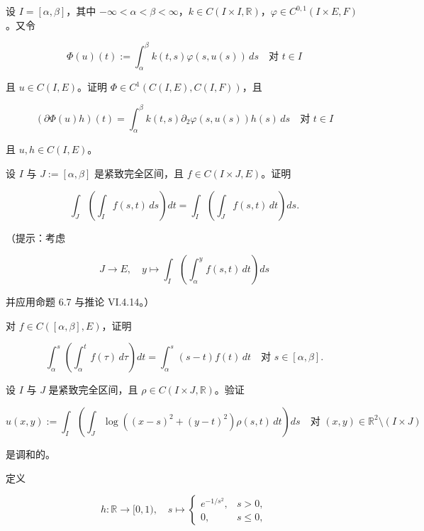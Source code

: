 \exerciseshead

\begin{exercises}
\item

设 $ I = [\alpha, \beta] $，其中 $ -\infty < \alpha < \beta < \infty $，$ k \in C(I \times I, \mathbb{R}) $，$ \varphi \in C^{0,1}(I \times E, F) $。又令

\[
\Phi(u)(t) := \int_{\alpha}^{\beta} k(t, s)\varphi(s, u(s)) \, ds \quad \text{对 } t \in I
\]

且 $ u \in C(I, E) $。证明 $ \Phi \in C^{1}(C(I, E), C(I, F)) $，且

\[
(\partial\Phi(u)h)(t) = \int_{\alpha}^{\beta} k(t, s)\partial_{2}\varphi(s, u(s))h(s) \, ds \quad \text{对 } t \in I
\]

且 $ u, h \in C(I, E) $。

\item

设 $ I $ 与 $ J := [\alpha, \beta] $ 是紧致完全区间，且 $ f \in C(I \times J, E) $。证明

\[
\int_{J} \left( \int_{I} f(s, t) \, ds \right) dt = \int_{I} \left( \int_{J} f(s, t) \, dt \right) ds .
\]

（提示：考虑

\[
J \to E , \quad y \mapsto \int_{I} \left( \int_{\alpha}^{y} f(s, t) \, dt \right) ds
\]

并应用命题 6.7 与推论 VI.4.14。）

\item

对 $ f \in C([\alpha, \beta], E) $，证明

\[
\int_{\alpha}^{s} \left( \int_{\alpha}^{t} f(\tau) \, d\tau \right) dt = \int_{\alpha}^{s} (s - t)f(t) \, dt \quad \text{对 } s \in [\alpha, \beta] .
\]
\item

设 $ I $ 与 $ J $ 是紧致完全区间，且 $ \rho \in C(I \times J, \mathbb{R}) $。验证

\[
u(x, y) := \int_{I} \left( \int_{J} \log\left( (x - s)^{2} + (y - t)^{2} \right)\rho(s, t) \, dt \right) ds \quad \text{对 } (x, y) \in \mathbb{R}^{2}\setminus(I \times J)
\]

是调和的。

\item

定义

\begin{equation*}
h : \mathbb{R} \to [0, 1) , \quad s \mapsto \begin{cases} e^{-1/s^{2}} , & s > 0 , \\ 0 , & s \le 0 , \end{cases}
\end{equation*}


\end{exercises}
